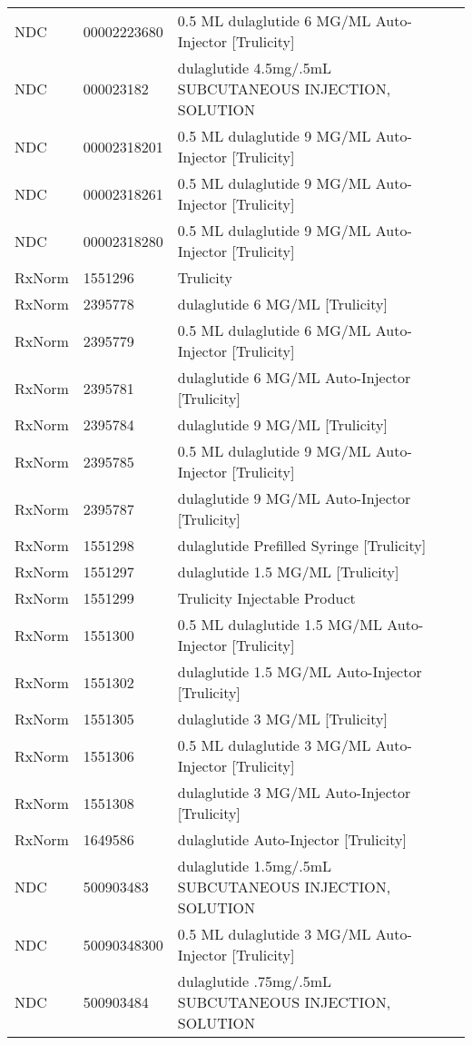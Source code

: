 \begin{longtable}{p{}p{}p{}}
  NDC & 00002223680 & 0.5 ML dulaglutide 6 MG/ML Auto-Injector [Trulicity] \\ 
  NDC & 000023182 & dulaglutide 4.5mg/.5mL SUBCUTANEOUS INJECTION, SOLUTION \\ 
  NDC & 00002318201 & 0.5 ML dulaglutide 9 MG/ML Auto-Injector [Trulicity] \\ 
  NDC & 00002318261 & 0.5 ML dulaglutide 9 MG/ML Auto-Injector [Trulicity] \\ 
  NDC & 00002318280 & 0.5 ML dulaglutide 9 MG/ML Auto-Injector [Trulicity] \\ 
  RxNorm & 1551296 & Trulicity \\ 
  RxNorm & 2395778 & dulaglutide 6 MG/ML [Trulicity] \\ 
  RxNorm & 2395779 & 0.5 ML dulaglutide 6 MG/ML Auto-Injector [Trulicity] \\ 
  RxNorm & 2395781 & dulaglutide 6 MG/ML Auto-Injector [Trulicity] \\ 
  RxNorm & 2395784 & dulaglutide 9 MG/ML [Trulicity] \\ 
  RxNorm & 2395785 & 0.5 ML dulaglutide 9 MG/ML Auto-Injector [Trulicity] \\ 
  RxNorm & 2395787 & dulaglutide 9 MG/ML Auto-Injector [Trulicity] \\ 
  RxNorm & 1551298 & dulaglutide Prefilled Syringe [Trulicity] \\ 
  RxNorm & 1551297 & dulaglutide 1.5 MG/ML [Trulicity] \\ 
  RxNorm & 1551299 & Trulicity Injectable Product \\ 
  RxNorm & 1551300 & 0.5 ML dulaglutide 1.5 MG/ML Auto-Injector [Trulicity] \\ 
  RxNorm & 1551302 & dulaglutide 1.5 MG/ML Auto-Injector [Trulicity] \\ 
  RxNorm & 1551305 & dulaglutide 3 MG/ML [Trulicity] \\ 
  RxNorm & 1551306 & 0.5 ML dulaglutide 3 MG/ML Auto-Injector [Trulicity] \\ 
  RxNorm & 1551308 & dulaglutide 3 MG/ML Auto-Injector [Trulicity] \\ 
  RxNorm & 1649586 & dulaglutide Auto-Injector [Trulicity] \\ 
  NDC & 500903483 & dulaglutide 1.5mg/.5mL SUBCUTANEOUS INJECTION, SOLUTION \\ 
  NDC & 50090348300 & 0.5 ML dulaglutide 3 MG/ML Auto-Injector [Trulicity] \\ 
  NDC & 500903484 & dulaglutide .75mg/.5mL SUBCUTANEOUS INJECTION, SOLUTION \\ 

\end{longtable}
